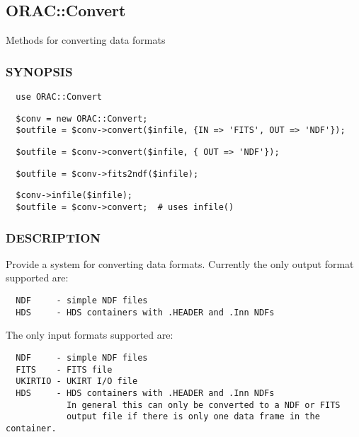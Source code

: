\subsection{ORAC::Convert\label{ORAC::Convert}}

Methods for converting data formats

\subsubsection*{SYNOPSIS\label{ORAC::Convert_SYNOPSIS}}\begin{verbatim}
  use ORAC::Convert
\end{verbatim}
\begin{verbatim}
  $conv = new ORAC::Convert;
  $outfile = $conv->convert($infile, {IN => 'FITS', OUT => 'NDF'});
\end{verbatim}
\begin{verbatim}
  $outfile = $conv->convert($infile, { OUT => 'NDF'});
\end{verbatim}
\begin{verbatim}
  $outfile = $conv->fits2ndf($infile);
\end{verbatim}
\begin{verbatim}
  $conv->infile($infile);
  $outfile = $conv->convert;  # uses infile()
\end{verbatim}
\subsubsection*{DESCRIPTION\label{ORAC::Convert_DESCRIPTION}}

Provide a system for converting data formats. Currently the
only output format supported are:

\begin{verbatim}
  NDF     - simple NDF files
  HDS     - HDS containers with .HEADER and .Inn NDFs
\end{verbatim}


The only input formats supported are:

\begin{verbatim}
  NDF     - simple NDF files
  FITS    - FITS file
  UKIRTIO - UKIRT I/O file
  HDS     - HDS containers with .HEADER and .Inn NDFs
            In general this can only be converted to a NDF or FITS
            output file if there is only one data frame in the container.
\end{verbatim}


